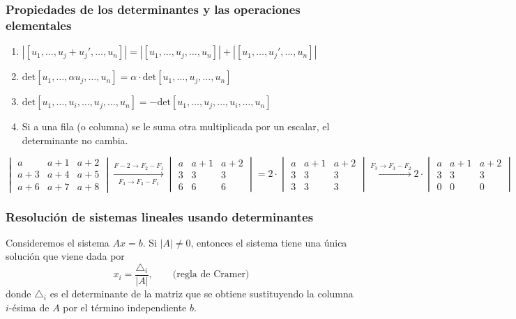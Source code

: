 \subsubsection{Propiedades de los determinantes y las operaciones elementales}
\begin{enumerate}[label=\color{lightblue}\arabic*)]
	\item $\left|[u_1,\dots,u_j+u_j',\dots,u_n]\right|=\left|[u_1,\dots,u_j,\dots,u_n]\right|+\left|[u_1,\dots,u_j',\dots,u_n]\right|$
	\item $\mathrm{det}[u_1,\dots,\alpha u_j,\dots,u_n]=\alpha\cdot\mathrm{det}[u_1,\dots,u_j,\dots,u_n]$
	\item $\mathrm{det}[u_1,\dots,u_i,\dots,u_j,\dots,u_n]=-\mathrm{det}[u_1,\dots,u_j,\dots,u_i,\dots,u_n]$
	\item Si a una fila (o columna) se le suma otra multiplicada por un escalar, el determinante no cambia.
\end{enumerate}
\Ej

$\begin{vmatrix}
	a & a+1 & a+2 \\
	a+3 & a+4 & a+5 \\
	a+6 & a+7 & a+8
\end{vmatrix}\xrightarrow[F_3\to F_3-F_1]{F-2\to F_2-F_1}\begin{vmatrix}
a & a+1 & a+2 \\
3 & 3 & 3 \\
6 & 6 & 6
\end{vmatrix}=2\cdot\begin{vmatrix}
a & a+1 & a+2 \\
3 & 3 & 3 \\
3 & 3 & 3
\end{vmatrix}\xrightarrow{F_3\to F_3-F_2}2\cdot\begin{vmatrix}
a & a+1 & a+2 \\
3 & 3 & 3 \\
0 & 0 & 0
\end{vmatrix}=0$
\subsubsection{Resolución de sistemas lineales usando determinantes}
Consideremos el sistema $Ax=b$. Si $|A|\neq0$, entonces el sistema tiene una única solución que viene dada por \[ x_i=\dfrac{\triangle_i}{|A|},\qquad\text{(regla de Cramer)} \]donde $\triangle_i$ es el determinante de la matriz que se obtiene sustituyendo la columna $i$-ésima de $A$ por el término independiente $b$.

